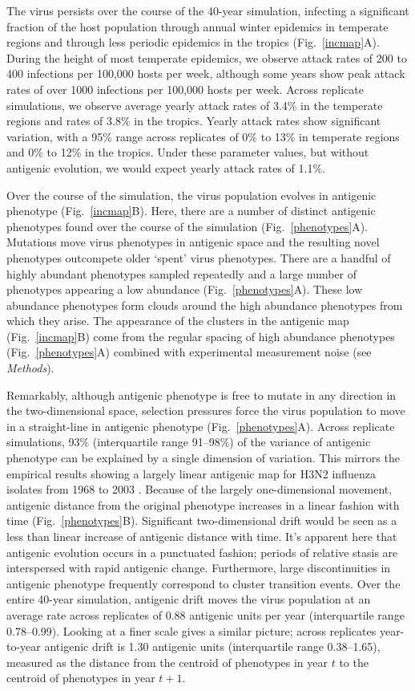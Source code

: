 \documentclass[11pt,oneside,letterpaper]{article}
\begin{document}
The virus persists over the course of the 40-year simulation, infecting a significant fraction of the host population through annual winter epidemics in temperate regions and through less periodic epidemics in the tropics (Fig.~\ref{incmap}A).  During the height of most temperate epidemics, we observe attack rates of 200 to 400 infections per 100,000 hosts per week, although some years show peak attack rates of over 1000 infections per 100,000 hosts per week.  Across replicate simulations, we observe average yearly attack rates of 3.4\% in the temperate regions and rates of 3.8\% in the tropics.  Yearly attack rates show significant variation, with a 95\% range across replicates of 0\% to 13\% in temperate regions and 0\% to 12\% in the tropics.  Under these parameter values, but without antigenic evolution, we would expect yearly attack rates of 1.1\%.

Over the course of the simulation, the virus population evolves in antigenic phenotype (Fig.~\ref{incmap}B).  Here, there are a number of distinct antigenic phenotypes found over the course of the simulation (Fig.~\ref{phenotypes}A).  Mutations move virus phenotypes in antigenic space and the resulting novel phenotypes outcompete older `spent' virus phenotypes.  There are a handful of highly abundant phenotypes sampled repeatedly and a large number of phenotypes appearing a low abundance (Fig.~\ref{phenotypes}A).  These low abundance phenotypes form clouds around the high abundance phenotypes from which they arise.  The appearance of the clusters in the antigenic map (Fig.~\ref{incmap}B) come from the regular spacing of high abundance phenotypes (Fig.~\ref{phenotypes}A) combined with experimental measurement noise (see \textsl{Methods}).

Remarkably, although antigenic phenotype is free to mutate in any direction in the two-dimensional space, selection pressures force the virus population to move in a straight-line in antigenic phenotype (Fig.~\ref{phenotypes}A).  Across replicate simulations, 93\% (interquartile range 91--98\%) of the variance of antigenic phenotype can be explained by a single dimension of variation.  This mirrors the empirical results showing a largely linear antigenic map for H3N2 influenza isolates from 1968 to 2003 \cite{Smith04}.  Because of the largely one-dimensional movement, antigenic distance from the original phenotype increases in a linear fashion with time (Fig.~\ref{phenotypes}B).  Significant two-dimensional drift would be seen as a less than linear increase of antigenic distance with time.  It's apparent here that antigenic evolution occurs in a punctuated fashion; periods of relative stasis are interspersed with rapid antigenic change.  Furthermore, large discontinuities in antigenic phenotype frequently correspond to cluster transition events.  Over the entire 40-year simulation, antigenic drift moves the virus population at an average rate across replicates of 0.88 antigenic units per year (interquartile range 0.78--0.99).  Looking at a finer scale gives a similar picture; across replicates year-to-year antigenic drift is 1.30 antigenic units (interquartile range 0.38--1.65), measured as the distance from the centroid of phenotypes in year $t$ to the centroid of phenotypes in year $t+1$.
\end{document}
